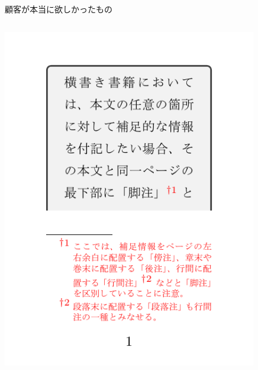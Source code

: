 \documentclass[unicode,14pt]{beamer}
\begin{document}
\begin{frame}[t]{顧客が本当に欲しかったもの}

\begin{columns}
\begin{column}{0.3\textwidth}
\colorbox{white}{\includegraphics[width=0.9\textwidth, page=1]{codes/history6.pdf}}
\end{column}
\begin{column}{0.3\textwidth}

\end{column}
\end{columns}
\end{frame}
\end{document}
